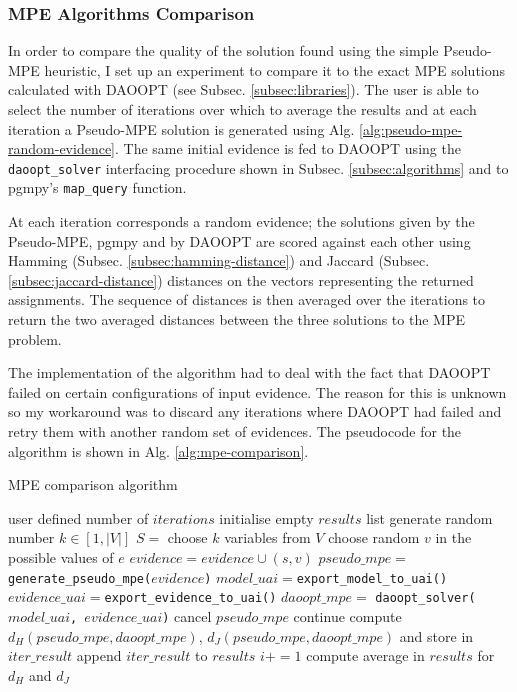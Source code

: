 \subsubsection{MPE Algorithms Comparison}
In order to compare the quality of the solution found using the simple Pseudo-MPE heuristic, I set up an experiment to compare it to the exact MPE solutions calculated with DAOOPT (see Subsec. \ref{subsec:libraries}).
The user is able to select the number of iterations over which to average the results and at each iteration a Pseudo-MPE solution is generated using Alg. \ref{alg:pseudo-mpe-random-evidence}.
The same initial evidence is fed to DAOOPT using the \texttt{daoopt\_solver} interfacing procedure shown in Subsec. \ref{subsec:algorithms} and to pgmpy's \texttt{map\_query} function.

At each iteration corresponds a random evidence; the solutions given by the Pseudo-MPE, pgmpy and by DAOOPT are scored against each other using Hamming (Subsec. \ref{subsec:hamming-distance}) and Jaccard (Subsec. \ref{subsec:jaccard-distance}) distances on the vectors representing the returned assignments.
The sequence of distances is then averaged over the iterations to return the two averaged distances between the three solutions to the MPE problem.

The implementation of the algorithm had to deal with the fact that DAOOPT failed on certain configurations of input evidence.
The reason for this is unknown so my workaround was to discard any iterations where DAOOPT had failed and retry them with another random set of evidences.
The pseudocode for the algorithm is shown in Alg. \ref{alg:mpe-comparison}.

\begin{algorithm}[htp!]
	\caption{MPE comparison algorithm}
	\label{alg:mpe-comparison}
	\begin{algorithmic}[1]
		\State user defined number of $iterations$
		\State initialise empty $results$ list
			\State generate random number $k \in [ 1, |V| ]$
			\State $S = $ choose $k$ variables from $V$
				\State choose random $v$ in the possible values of $e$ 
				\State $evidence = evidence \cup (s,v)$
			\EndFor
			\State $pseudo\_mpe = $ \texttt{generate\_pseudo\_mpe($evidence$)}
			\State $model\_uai=$\texttt{export\_model\_to\_uai()}
			\State $evidence\_uai=$\texttt{export\_evidence\_to\_uai()}
			\State $daoopt\_mpe = $ \texttt{daoopt\_solver($model\_uai$, $evidence\_uai$)}
			 
				\State cancel $pseudo\_mpe$
				\State continue
			\EndIf
			\State compute $d_H(pseudo\_mpe,daoopt\_mpe)$, $d_J(pseudo\_mpe,daoopt\_mpe)$ and store in $iter\_result$
			\State append $iter\_result$ to $results$
			\State $i+=1$
		\EndWhile
		\State compute average in $results$ for $d_H$ and $d_J$
	\end{algorithmic}
\end{algorithm}

